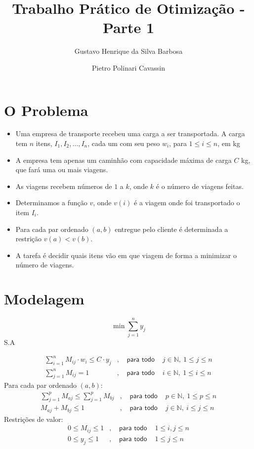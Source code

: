 \documentclass{article}
\title{Trabalho Prático de Otimização - Parte 1}
\author{
    Gustavo Henrique da Silva Barbosa
    \and
    Pietro Polinari Cavassin
}
\begin{document}
\maketitle

\section{O Problema}
\begin{itemize}
\item Uma empresa de transporte recebeu uma carga a ser transportada.
A carga tem $n$ itens, $I_1, I_2, \dots, I_n$, cada um com seu peso 
$w_i$, para $1 \le i \le n$, em kg

\item A empresa tem apenas um caminhão com capacidade máxima de carga $C$ kg,
que fará uma ou mais viagens.

\item As viagens recebem números de $1$ a $k$, onde $k$ é o número de viagens
feitas.

\item Determinamos a função $v$, onde $v(i)$ é a viagem onde foi transportado
o item $I_i$. 

\item Para cada par ordenado $(a, b)$ entregue pelo cliente é determinada a
restrição $v(a) < v(b)$.

\item A tarefa é decidir quais itens vão em que viagem de forma a minimizar
o número de viagens.
\end{itemize}

\newpage
\section{Modelagem}

$$\min \sum_{j=1}^n y_j$$
S.A 

\begin{align}
\sum_{i=1}^n M_{ij} \cdot w_i \le C \cdot y_j&, & 
    \textsf{ para todo }& j \in \mathbb{N},\ 1 \le j \le n\\
\sum_{j=1}^n M_{ij} = 1&,             & 
    \textsf{ para todo }& i \in \mathbb{N},\ 1 \le i \le n
\end{align}
Para cada par ordenado $(a,b)$:
\begin{align}
\sum_{j=1}^p M_{aj} \le \sum_{j=1}^p M_{bj}&, & 
    \textsf{ para todo }& p \in \mathbb{N},\ 1 \le p \le n\\
M_{aj} + M_{bj} \le 1&, &
    \textsf{ para todo }& j \in \mathbb{N},\ i \le j \le n
\end{align}
Restrições de valor:
\begin{align}
0 \le M_{ij}\le 1&, &
    \textsf{ para todo }& 1 \le i,j \le n\\
0 \le y_{j}\le 1&, &
    \textsf{ para todo }& 1 \le j \le n
\end{align}
\end{document}
